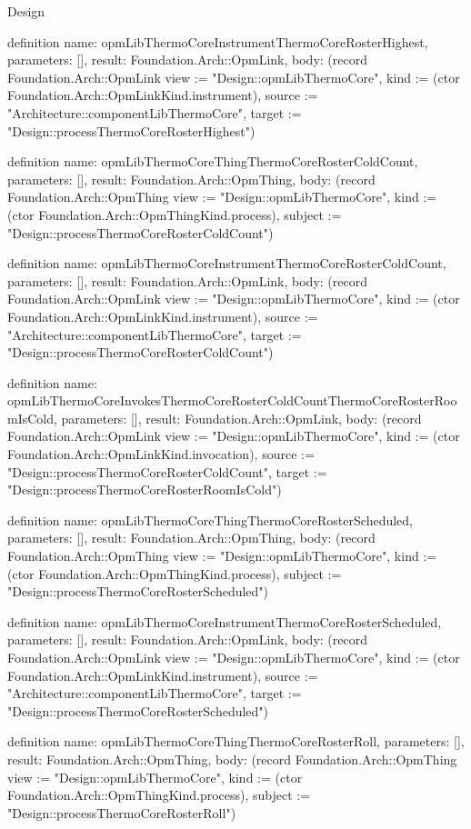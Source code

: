 \begin{lexlean}{Design}
\begin{semanticmodule}
definition{
  name: opmLibThermoCoreInstrumentThermoCoreRosterHighest,
  parameters: [],
  result: Foundation.Arch::OpmLink,
  body: (record Foundation.Arch::OpmLink {view := "Design::opmLibThermoCore", kind := (ctor Foundation.Arch::OpmLinkKind.instrument), source := "Architecture::componentLibThermoCore", target := "Design::processThermoCoreRosterHighest"})
}

definition{
  name: opmLibThermoCoreThingThermoCoreRosterColdCount,
  parameters: [],
  result: Foundation.Arch::OpmThing,
  body: (record Foundation.Arch::OpmThing {view := "Design::opmLibThermoCore", kind := (ctor Foundation.Arch::OpmThingKind.process), subject := "Design::processThermoCoreRosterColdCount"})
}

definition{
  name: opmLibThermoCoreInstrumentThermoCoreRosterColdCount,
  parameters: [],
  result: Foundation.Arch::OpmLink,
  body: (record Foundation.Arch::OpmLink {view := "Design::opmLibThermoCore", kind := (ctor Foundation.Arch::OpmLinkKind.instrument), source := "Architecture::componentLibThermoCore", target := "Design::processThermoCoreRosterColdCount"})
}

definition{
  name: opmLibThermoCoreInvokesThermoCoreRosterColdCountThermoCoreRosterRoomIsCold,
  parameters: [],
  result: Foundation.Arch::OpmLink,
  body: (record Foundation.Arch::OpmLink {view := "Design::opmLibThermoCore", kind := (ctor Foundation.Arch::OpmLinkKind.invocation), source := "Design::processThermoCoreRosterColdCount", target := "Design::processThermoCoreRosterRoomIsCold"})
}

definition{
  name: opmLibThermoCoreThingThermoCoreRosterScheduled,
  parameters: [],
  result: Foundation.Arch::OpmThing,
  body: (record Foundation.Arch::OpmThing {view := "Design::opmLibThermoCore", kind := (ctor Foundation.Arch::OpmThingKind.process), subject := "Design::processThermoCoreRosterScheduled"})
}

definition{
  name: opmLibThermoCoreInstrumentThermoCoreRosterScheduled,
  parameters: [],
  result: Foundation.Arch::OpmLink,
  body: (record Foundation.Arch::OpmLink {view := "Design::opmLibThermoCore", kind := (ctor Foundation.Arch::OpmLinkKind.instrument), source := "Architecture::componentLibThermoCore", target := "Design::processThermoCoreRosterScheduled"})
}

definition{
  name: opmLibThermoCoreThingThermoCoreRosterRoll,
  parameters: [],
  result: Foundation.Arch::OpmThing,
  body: (record Foundation.Arch::OpmThing {view := "Design::opmLibThermoCore", kind := (ctor Foundation.Arch::OpmThingKind.process), subject := "Design::processThermoCoreRosterRoll"})
}


\end{semanticmodule}
\end{lexlean}
